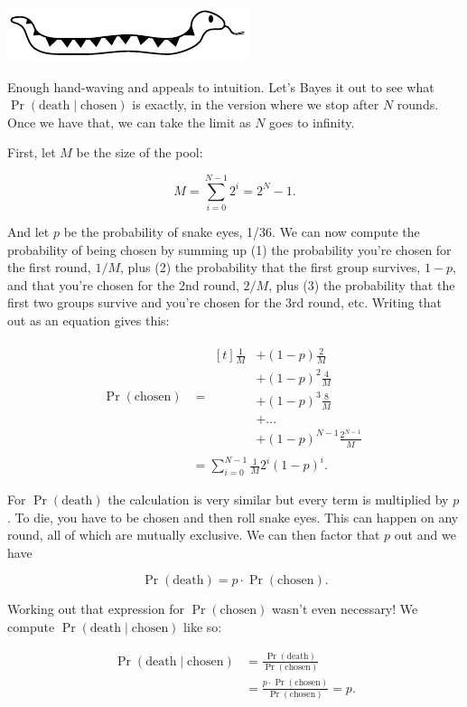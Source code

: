 \documentclass[article,twocolumn]{memoir}
\newcommand{\snakedivider}{
\vspace{.2em}
\begin{center}
\includegraphics[width=.25\linewidth]{snake}
\end{center}
\vspace{.1em}
}
\begin{document}
\snakedivider

Enough hand-waving and appeals to intuition.
Let's Bayes it out to see what 
$\Pr(\text{death} \mid \text{chosen})$
is exactly, in the version where we stop after $N$ rounds.
Once we have that, we can take the limit as $N$ goes to infinity.

First, let $M$ be the size of the pool:

$$M = \sum_{i=0}^{N-1} 2^i = 2^N-1.$$

And let $p$ be the probability of snake eyes, 1/36.
We can now compute the probability of being chosen by summing up 
(1) the probability you're chosen for the first round, $1/M$, plus 
(2) the probability that the first group survives, $1-p$, and that you're chosen for the 2nd round, $2/M$, plus 
(3) the probability that the first two groups survive and you're chosen for the 3rd round, etc.
Writing that out as an equation gives this:

\begin{align*}
\Pr(\text{chosen}) & = 
\begin{aligned}[t]
\tfrac{1}{M} & + (1-p)      \tfrac{2}{M} \\
             & + (1-p)^2    \tfrac{4}{M} \\
             & + (1-p)^3    \tfrac{8}{M} \\
             & + \ldots                  \\
             & + (1-p)^{N-1}\frac{2^{N-1}}{M}
\end{aligned} \\
& = \sum_{i=0}^{N-1} \tfrac{1}{M} 2^i(1-p)^i.
\end{align*}

For $\Pr(\text{death})$ the calculation is very similar but every term is multiplied by $p$.
To die, you have to be chosen and then roll snake eyes.
This can happen on any round, all of which are mutually exclusive.
We can then factor that $p$ out and we have

$$
\Pr(\text{death}) = p\cdot\Pr(\text{chosen}).
$$

Working out that expression for $\Pr(\text{chosen})$ wasn't even necessary!
We compute $\Pr(\text{death} \mid \text{chosen})$ like so:

\begin{equation*}
\begin{split}
\Pr(\text{death} \mid \text{chosen}) & = 
\frac{\Pr(\text{death})}{\Pr(\text{chosen})} \\
& = \frac{p\cdot\Pr(\text{chosen})}{\Pr(\text{chosen})} = 
p.
\end{split}
\end{equation*}
\end{document}
